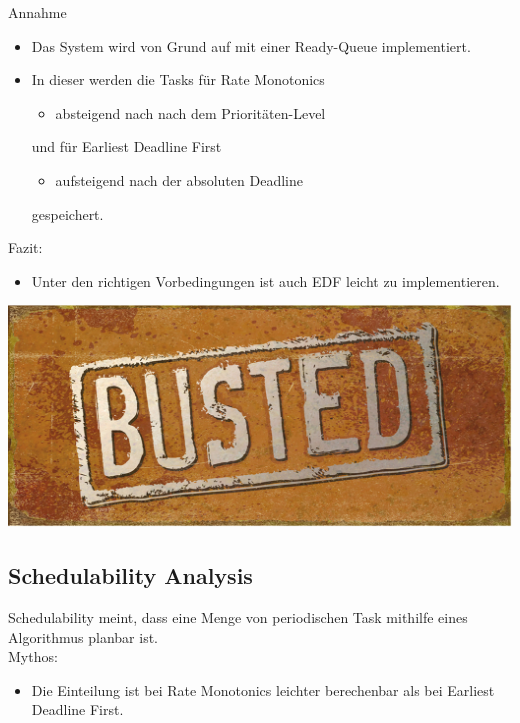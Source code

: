 \begin{frame}{\subsecname}
	Annahme
	\begin{itemize}
		\item Das System wird von Grund auf mit einer Ready-Queue implementiert.\pause
		\item In dieser werden die Tasks für Rate Monotonics
			\begin{itemize}
				\item absteigend nach nach dem Prioritäten-Level
			\end{itemize}
			und für Earliest Deadline First
			\begin{itemize}
				\item aufsteigend nach der absoluten Deadline
			\end{itemize} gespeichert.
	\end{itemize}
\end{frame}

\begin{frame}{\subsecname}
	Fazit:
	\begin{itemize}
		\item Unter den richtigen Vorbedingungen ist auch EDF leicht zu implementieren.
	\end{itemize}
\end{frame}

\begin{frame}{\subsecname}
	\begin{center}
			\includegraphics[scale=1]{graphics/memes/busted.jpg}
	\end{center}
\end{frame}



\subsection{Schedulability Analysis}\label{SchedulabilityAnalaysis}
\begin{frame}{\subsecname}
	Schedulability meint, dass eine Menge von periodischen Task mithilfe eines Algorithmus planbar ist.\\[2ex]
	Mythos:\pause
	\begin{itemize}
		\item Die Einteilung ist bei Rate Monotonics leichter berechenbar als bei Earliest Deadline First.
	\end{itemize}
\end{frame}

